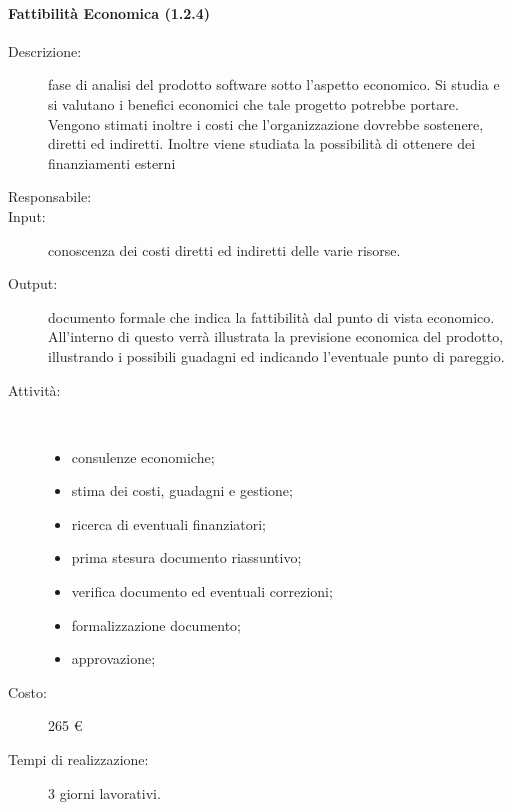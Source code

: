 \paragraph{Fattibilit\`{a} Economica (1.2.4)}
\begin{description}
\item[Descrizione:] fase di analisi del prodotto software sotto l'aspetto economico. Si studia e si valutano i benefici economici che tale progetto potrebbe portare. Vengono stimati inoltre i costi che l'organizzazione dovrebbe sostenere, diretti ed indiretti. Inoltre viene studiata la possibilit\`{a} di ottenere dei finanziamenti esterni 
\item[Responsabile:] 
\item[Input:] conoscenza dei costi diretti ed indiretti delle varie risorse.
\item[Output:] documento formale che indica la fattibilità dal punto di vista economico. All'interno di questo verrà illustrata la previsione economica del prodotto, illustrando i possibili guadagni ed indicando l'eventuale punto di pareggio.
\item[Attività:]\mbox{}\\[-1.5\baselineskip]
	\begin{itemize}
	\item consulenze economiche;
	\item stima dei costi, guadagni e gestione;
	\item ricerca di eventuali finanziatori;
	\item prima stesura documento riassuntivo;
	\item verifica documento ed eventuali correzioni;
	\item formalizzazione documento;
	\item approvazione;
	\end{itemize}
\item[Costo:] 265 \euro{}
\item[Tempi di realizzazione:] 3 giorni lavorativi.
\end{description}

